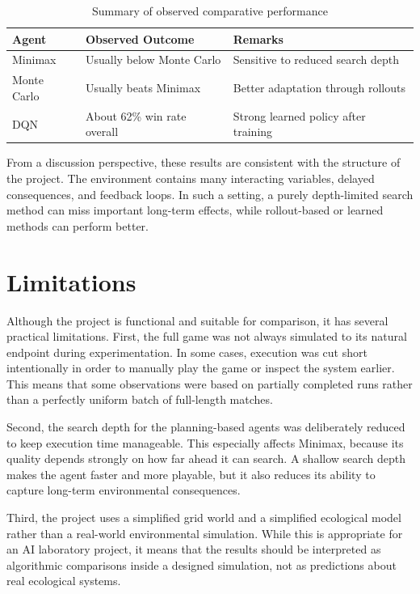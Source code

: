 \documentclass[12pt,a4paper]{article}
\begin{document}
\begin{table}[H]
\centering
\begin{tabular}{|l|l|l|}
\hline
\textbf{Agent} & \textbf{Observed Outcome} & \textbf{Remarks} \\ \hline
Minimax & Usually below Monte Carlo & Sensitive to reduced search depth \\ \hline
Monte Carlo & Usually beats Minimax & Better adaptation through rollouts \\ \hline
DQN & About 62\% win rate overall & Strong learned policy after training \\ \hline
\end{tabular}
\caption{Summary of observed comparative performance}
\end{table}

From a discussion perspective, these results are consistent with the structure of the project. The environment contains many interacting variables, delayed consequences, and feedback loops. In such a setting, a purely depth-limited search method can miss important long-term effects, while rollout-based or learned methods can perform better. 

\clearpage
\section{Limitations}

Although the project is functional and suitable for comparison, it has several practical limitations. First, the full game was not always simulated to its natural endpoint during experimentation. In some cases, execution was cut short intentionally in order to manually play the game or inspect the system earlier. This means that some observations were based on partially completed runs rather than a perfectly uniform batch of full-length matches.

Second, the search depth for the planning-based agents was deliberately reduced to keep execution time manageable. This especially affects Minimax, because its quality depends strongly on how far ahead it can search. A shallow search depth makes the agent faster and more playable, but it also reduces its ability to capture long-term environmental consequences.

Third, the project uses a simplified grid world and a simplified ecological model rather than a real-world environmental simulation. While this is appropriate for an AI laboratory project, it means that the results should be interpreted as algorithmic comparisons inside a designed simulation, not as predictions about real ecological systems.
\end{document}
